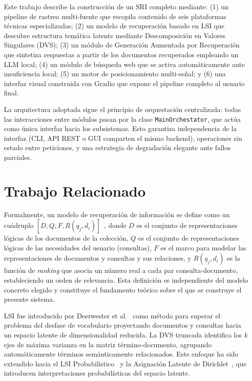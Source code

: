 \documentclass[runningheads,a4paper]{llncs}
\begin{document}
Este trabajo describe la construcción de un SRI completo mediante: (1) un pipeline de rastreo multi-fuente que recopila contenido de seis plataformas técnicas especializadas; (2) un modelo de recuperación basado en LSI que descubre estructura temática latente mediante Descomposición en Valores Singulares (DVS); (3) un módulo de Generación Aumentada por Recuperación que sintetiza respuestas a partir de los documentos recuperados empleando un LLM local; (4) un módulo de búsqueda web que se activa automáticamente ante insuficiencia local; (5) un motor de posicionamiento multi-señal; y (6) una interfaz visual construida con Gradio que expone el pipeline completo al usuario final.

La arquitectura adoptada sigue el principio de orquestación centralizada: todas las interacciones entre módulos pasan por la clase \texttt{MainOrchestator}, que actúa como única interfaz hacia los subsistemas. Esto garantiza independencia de la interfaz (CLI, API REST o GUI comparten el mismo backend), operaciones sin estado entre peticiones, y una estrategia de degradación elegante ante fallos parciales.

\section{Trabajo Relacionado}

Formalmente, un modelo de recuperación de información se define como un cuádruplo $[D, Q, F, R(q_j, d_i)]$~\cite{baezayates1999}, donde $D$ es el conjunto de representaciones lógicas de los documentos de la colección, $Q$ es el conjunto de representaciones lógicas de las necesidades del usuario (consultas), $F$ es el marco para modelar las representaciones de documentos y consultas y sus relaciones, y $R(q_j, d_i)$ es la función de \emph{ranking} que asocia un número real a cada par consulta-documento, estableciendo un orden de relevancia. Esta definición es independiente del modelo concreto elegido y constituye el fundamento teórico sobre el que se construye el presente sistema.

LSI fue introducido por Deerwester et al.~\cite{deerwester1990} como método para superar el problema del desfase de vocabulario proyectando documentos y consultas hacia un espacio latente de dimensionalidad reducida. La DVS truncada identifica los $k$ ejes de máxima varianza en la matriz término-documento, agrupando automáticamente términos semánticamente relacionados. Este enfoque ha sido extendido hacia el LSI Probabilístico~\cite{hofmann1999} y la Asignación Latente de Dirichlet~\cite{blei2003}, que introducen interpretaciones probabilísticas del espacio latente.
\end{document}

